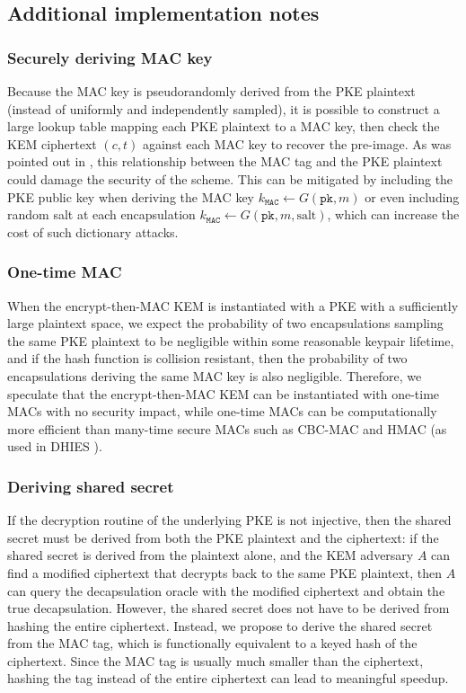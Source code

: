\documentclass[runningheads]{llncs}
\newcommand{\mac}{\texttt{MAC}}
\newcommand{\pk}{\texttt{pk}}
\begin{document}
\subsection{Additional implementation notes}\label{sec:discussion-on-real-world-attacks}
\subsubsection{Securely deriving MAC key} Because the MAC key is pseudorandomly derived from the PKE plaintext (instead of uniformly and independently sampled), it is possible to construct a large lookup table mapping each PKE plaintext to a MAC key, then check the KEM ciphertext $(c, t)$ against each MAC key to recover the pre-image. As was pointed out in \cite{DBLP:journals/iacr/Bernstein21,cryptoeprint:2021/912}, this relationship between the MAC tag and the PKE plaintext could damage the security of the scheme. This can be mitigated by including the PKE public key when deriving the MAC key $k_\mac \leftarrow G(\pk, m)$ or even including random salt at each encapsulation $k_\mac \leftarrow G(\pk, m, \text{salt})$, which can increase the cost of such dictionary attacks.

\subsubsection{One-time MAC} When the encrypt-then-MAC KEM is instantiated with a PKE with a sufficiently large plaintext space, we expect the probability of two encapsulations sampling the same PKE plaintext to be negligible within some reasonable keypair lifetime, and if the hash function is collision resistant, then the probability of two encapsulations deriving the same MAC key is also negligible. Therefore, we speculate that the encrypt-then-MAC KEM can be instantiated with one-time MACs \cite{DBLP:journals/jcss/CarterW79} with no security impact, while one-time MACs can be computationally more efficient than many-time secure MACs such as CBC-MAC and HMAC (as used in DHIES \cite{DBLP:conf/ctrsa/AbdallaBR01}).

\subsubsection{Deriving shared secret} If the decryption routine of the underlying PKE is not injective, then the shared secret must be derived from both the PKE plaintext and the ciphertext: if the shared secret is derived from the plaintext alone, and the KEM adversary $A$ can find a modified ciphertext that decrypts back to the same PKE plaintext, then $A$ can query the decapsulation oracle with the modified ciphertext and obtain the true decapsulation. However, the shared secret does not have to be derived from hashing the entire ciphertext. Instead, we propose to derive the shared secret from the MAC tag, which is functionally equivalent to a keyed hash of the ciphertext. Since the MAC tag is usually much smaller than the ciphertext, hashing the tag instead of the entire ciphertext can lead to meaningful speedup.
\end{document}
